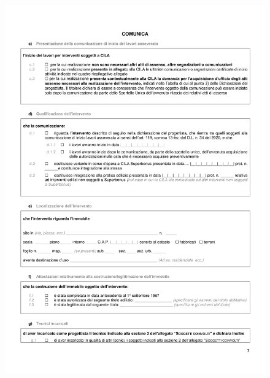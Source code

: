 \documentclass{elegantbook}
\begin{document}
		\begin{figure}[H]
			\centering
			\includegraphics[scale=0.8]{../Img/Documents/CILAS/CILAS-3.png}
		\end{figure}
\end{document}
